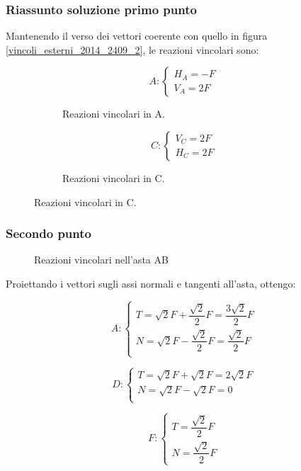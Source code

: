 \documentclass[main.tex]{subfiles}
\begin{document}
\subsubsection{Riassunto soluzione primo punto} Mantenendo il verso dei vettori coerente con quello in figura \ref{vincoli_esterni_2014_2409_2}, le reazioni vincolari sono:
\begin{figure}[H]
  \begin{subfigure}[b]{.5\textwidth}
  \centering
  \[
  	A: \begin{cases}
		H_A = -F\\
		V_A = 2F
  	\end{cases}
  \]
  \caption{Reazioni vincolari in A.}
  \end{subfigure}
  \hfill
  \begin{subfigure}[b]{.5\textwidth}
  \centering
  \[
  	C: \begin{cases}
  		V_C = 2F\\
  		H_C = 2F
  	\end{cases}
  \]
  \caption{Reazioni vincolari in C.}
  \end{subfigure}
\end{figure}

\subsubsection{Secondo punto}

\begin{figure}[H]
\centering
\resizebox{.3\textwidth}{!}{}
\caption{Reazioni vincolari nell'asta AB}
\label{asta_AB_2014_2409_2}
\end{figure}

Proiettando i vettori sugli assi normali e tangenti all'asta, ottengo:

\[
A: \begin{cases}
	T = \sqrt{2}F + \dfrac{\sqrt{2}}{2}F = \dfrac{3\sqrt{2}}{2}F \\
	N = \sqrt{2}F - \dfrac{\sqrt{2}}{2}F = \dfrac{\sqrt{2}}{2}F\\
\end{cases}
\]

\[
D: \begin{cases}
	T = \sqrt{2}F + \sqrt{2}F = 2\sqrt{2}F \\
	N = \sqrt{2}F - \sqrt{2}F = 0\\
\end{cases}
\]

\[
F: \begin{cases}
	T = \dfrac{\sqrt{2}}{2}F\\
	N = \dfrac{\sqrt{2}}{2}F
\end{cases}
\]
\end{document}
